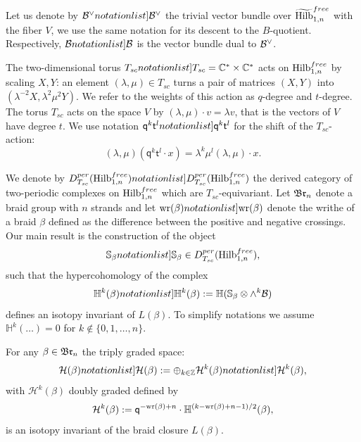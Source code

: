 \documentclass[10pt]{amsart}
\def\ZZ{\mathbb{Z} }
\def\shdg#1{ \mathsf{#1}}
\def\shq{ \shdg{q}}
\def\sht{ \shdg{t}}
\begin{document}
Let us denote by  $\SymbolPrint{\calB^\vee}$  the trivial vector bundle over $\widetilde{\mathrm{Hilb}}_{1,n}^{free}$ with the fiber $V$, we use the same notation for
 its   descent to the $B$-quotient. Respectively, $\SymbolPrint{\calB}$ is the vector bundle dual to $\mathcal{B}^\vee$.



The two-dimensional torus
$\SymbolPrint{\Tsc}=\CC^*\times\CC^*$ acts on  $\mathrm{Hilb}_{1,n}^{free}$ by scaling $X,Y$: an element $(\lambda,\mu)\in T_{sc}$ turns a pair of matrices $(X,Y)$ into $(\lambda^{-2}X,\lambda^2 \mu^2Y)$.
We refer to the weights of this action as $q$-degree and $t$-degree.
The torus \(T_{sc}\) acts on the space \(V\) by \((\lambda,\mu)\cdot v=\lambda v\), that is the vectors of \(V\) have degree \(t\).
We use notation \(\SymbolPrint{\shq^k\sht^l}\) for the shift of the \(T_{sc}\)-action: \[(\lambda,\mu)(\shq^k\sht^l\cdot x)=\lambda^k\mu^l (\lambda,\mu)\cdot x.\]

We denote by $\SymbolPrint{D^{per}_{T_{sc}}(\Hilb_{1,n}^{free})}$ the derived category of two-periodic
 complexes on $\mathrm{Hilb}_{1,n}^{free}$ which are $T_{sc}$-equivariant. Let $\mathfrak{Br}_n$ denote a braid group with $n$ strands and let $\SymbolPrint{\xwr(\beta)}$ denote the writhe of a braid $\beta$
defined as the difference between the positive and negative crossings.
Our main result is the construction of the object
$$ \SymbolPrint{\bbS_\beta}\in D^{per}_{T_{sc}}(\Hilb_{1,n}^{free}),$$
such that the hypercohomology of the complex
$$ \SymbolPrint{\mathbb{H}^k(\beta)}:=\mathbb{H}(\bbS_\beta\otimes \wedge^k\calB)$$
defines an isotopy invariant of $L(\beta)$. To simplify notations we assume  \(\mathbb{H}^k(\dots)=0\) for \(k\notin \{0,1,\dots,n\}\).

\begin{theorem}\label{thm: intro main} For any $\beta\in \mathfrak{Br}_n$ the triply graded space:
\[\SymbolPrint{\mathcal{H}(\beta)}:=\oplus_{k\in\ZZ}\SymbolPrint{\mathcal{H}^k(\beta)},\]
with \(\mathcal{H}^k(\beta)\)  doubly graded  defined by
$$\calH^k(\beta):=\shq^{-\xwr(\beta)+n}\cdot\mathbb{H}^{(k-\xwr(\beta)+n-1)/2}(\beta),$$
is an isotopy invariant of the braid closure $L(\beta)$.
\end{theorem}
\end{document}
